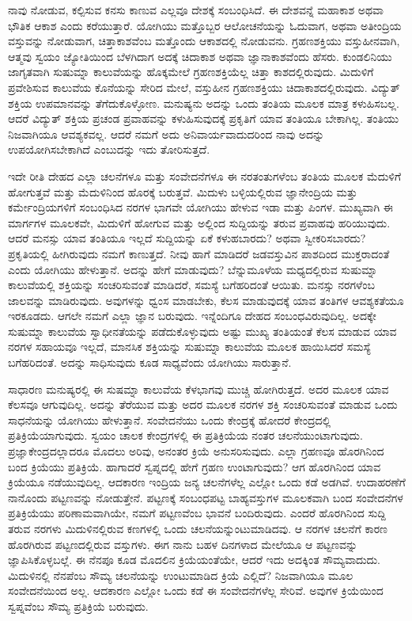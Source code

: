 ನಾವು ನೋಡುವ, ಕಲ್ಪಿಸುವ ಕನಸು ಕಾಣುವ ಎಲ್ಲವೂ ದೇಶಕ್ಕೆ ಸಂಬಂಧಿಸಿದೆ. ಈ ದೇಶವನ್ನೆ ಮಹಾಕಾಶ ಅಥವಾ ಭೌತಿಕ ಆಕಾಶ ಎಂದು ಕರೆಯುತ್ತಾರೆ. ಯೋಗಿಯು ಮತ್ತೊಬ್ಬರ ಆಲೋಚನೆಯನ್ನು ಓದುವಾಗ, ಅಥವಾ ಅತೀಂದ್ರಿಯ ವಸ್ತುವನ್ನು ನೋಡುವಾಗ, ಚಿತ್ತಾಕಾಶವೆಂಬ ಮತ್ತೊಂದು ಆಕಾಶದಲ್ಲಿ ನೋಡುವನು. ಗ್ರಹಣಶಕ್ತಿಯು ವಸ್ತುಹೀನವಾಗಿ, ಆತ್ಮವು ಸ್ವಯಂ ಜ್ಯೋತಿಯಿಂದ ಬೆಳಗಿದಾಗ ಅದಕ್ಕೆ ಚಿದಾಕಾಶ ಅಥವಾ ಜ್ಞಾನಾಕಾಶವೆಂದು ಹೆಸರು. ಕುಂಡಲಿನಿಯು ಜಾಗೃತವಾಗಿ ಸುಷುಮ್ನಾ ಕಾಲುವೆಯನ್ನು ಹೊಕ್ಕಮೇಲೆ ಗ್ರಹಣಶಕ್ತಿಯೆಲ್ಲ ಚಿತ್ತಾ ಕಾಶದಲ್ಲಿರುವುದು. ಮಿದುಳಿಗೆ ಪ್ರವೇಶಿಸುವ ಕಾಲುವೆಯ ಕೊನೆಯನ್ನು ಸೇರಿದ ಮೇಲೆ, ವಸ್ತುಹೀನ ಗ್ರಹಣಶಕ್ತಿಯು  ಚಿದಾಕಾಶದಲ್ಲಿರುವುದು. ವಿದ್ಯುತ್​ಶಕ್ತಿಯ ಉಪಮಾನವನ್ನು ತೆಗೆದುಕೊಳ್ಳೋಣ. ಮನುಷ್ಯನು ಅದನ್ನು ಒಂದು ತಂತಿಯ ಮೂಲಕ ಮಾತ್ರ ಕಳುಹಿಸಬಲ್ಲ. ಆದರೆ ವಿದ್ಯುತ್​ ಶಕ್ತಿಯ ಪ್ರಚಂಡ ಪ್ರವಾಹವನ್ನು ಕಳುಹಿಸುವುದಕ್ಕೆ ಪ್ರಕೃತಿಗೆ ಯಾವ ತಂತಿಯೂ ಬೇಕಾಗಿಲ್ಲ. ತಂತಿಯು ನಿಜವಾಗಿಯೂ ಆವಶ್ಯಕವಲ್ಲ. ಆದರೆ ನಮಗೆ ಅದು ಅನಿವಾರ್ಯವಾದುದರಿಂದ ನಾವು ಅದನ್ನು ಉಪಯೋಗಿಸಬೇಕಾಗಿದೆ ಎಂಬುದನ್ನು ಇದು ತೋರಿಸುತ್ತದೆ. 



ಇದೇ ರೀತಿ ದೇಹದ ಎಲ್ಲಾ ಚಲನೆಗಳೂ ಮತ್ತು ಸಂವೇದನೆಗಳೂ ಈ ನರತಂತುಗಳೆಂಬ ತಂತಿಯ ಮೂಲಕ ಮೆದುಳಿಗೆ ಹೋಗುತ್ತವೆ ಮತ್ತು ಮೆದುಳಿನಿಂದ ಹೊರಕ್ಕೆ ಬರುತ್ತವೆ. ಮಿದುಳು ಬಳ್ಳಿಯಲ್ಲಿರುವ ಜ್ಞಾನೇಂದ್ರಿಯ ಮತ್ತು ಕರ್ಮೇಂದ್ರಿಯಗಳಿಗೆ ಸಂಬಂಧಿಸಿದ ನರಗಳ ಭಾಗವೇ ಯೋಗಿಯು ಹೇಳುವ ಇಡಾ ಮತ್ತು ಪಿಂಗಳ. ಮುಖ್ಯವಾಗಿ ಈ ಮಾರ್ಗಗಳ ಮೂಲಕವೇ, ಮಿದುಳಿಗೆ ಹೋಗುವ ಮತ್ತು ಅಲ್ಲಿಂದ ಸುದ್ದಿಯನ್ನು ತರುವ ಪ್ರವಾಹವು ಹರಿಯುವುದು. ಆದರೆ ಮನಸ್ಸು ಯಾವ ತಂತಿಯೂ ಇಲ್ಲದೆ ಸುದ್ದಿಯನ್ನು ಏಕೆ ಕಳುಹಬಾರದು? ಅಥವಾ ಸ್ವೀಕರಿಸಬಾರದು? ಪ್ರಕೃತಿಯಲ್ಲಿ ಹೀಗಿರುವುದು ನಮಗೆ ಕಾಣುತ್ತದೆ. ನೀವು ಹಾಗೆ ಮಾಡಿದರೆ ಜಡವಸ್ತುವಿನ ಪಾಶದಿಂದ ಮುಕ್ತರಾದಂತೆ ಎಂದು ಯೋಗಿಯು ಹೇಳುತ್ತಾನೆ. ಅದನ್ನು ಹೇಗೆ ಮಾಡುವುದು? ಬೆನ್ನುಮೂಳೆಯ ಮಧ್ಯದಲ್ಲಿರುವ ಸುಷುಮ್ನಾ ಕಾಲುವೆಯಲ್ಲಿ ಶಕ್ತಿಯನ್ನು ಸಂಚರಿಸುವಂತೆ ಮಾಡಿದರೆ, ಸಮಸ್ಯೆ ಬಗೆಹರಿದಂತೆ ಆಯಿತು. ಮನಸ್ಸು ನರಗಳೆಂಬ ಜಾಲವನ್ನು ಮಾಡಿರುವುದು. ಅವುಗಳನ್ನು ಧ್ವಂಸ ಮಾಡಬೇಕು, ಕೆಲಸ ಮಾಡುವುದಕ್ಕೆ ಯಾವ ತಂತಿಗಳ ಆವಶ್ಯಕತೆಯೂ ಇರಕೂಡದು. ಆಗಲೇ ನಮಗೆ ಎಲ್ಲಾ ಜ್ಞಾನ ಬರುವುದು. ಇನ್ನೆಂದಿಗೂ ದೇಹದ ಸಂಬಂಧವಿರುವುದಿಲ್ಲ. ಅದಕ್ಕೇ ಸುಷುಮ್ನಾ ಕಾಲುವೆಯ ಸ್ವಾಧೀನತೆಯನ್ನು ಪಡೆದುಕೊಳ್ಳುವುದು ಅಷ್ಟು ಮುಖ್ಯ ತಂತಿಯಂತೆ ಕೆಲಸ ಮಾಡುವ ಯಾವ ನರಗಳ ಸಹಾಯವೂ ಇಲ್ಲದೆ, ಮಾನಸಿಕ ಶಕ್ತಿಯನ್ನು ಸುಷುಮ್ನಾ ಕಾಲುವೆಯ ಮೂಲಕ ಹಾಯಿಸಿದರೆ ಸಮಸ್ಯೆ ಬಗೆಹರಿದಂತೆ. ಅದನ್ನು ಸಾಧಿಸುವುದು ಕೂಡ ಸಾಧ್ಯವೆಂದು ಯೋಗಿಯು ಸಾರುತ್ತಾನೆ. 


ಸಾಧಾರಣ ಮನುಷ್ಯರಲ್ಲಿ ಈ ಸುಷಮ್ನಾ ಕಾಲುವೆಯ ಕೆಳಭಾಗವು ಮುಚ್ಚಿ ಹೋಗಿರುತ್ತದೆ. ಅದರ ಮೂಲಕ ಯಾವ ಕೆಲಸವೂ ಆಗುವುದಿಲ್ಲ. ಅದನ್ನು ತೆರೆಯುವ ಮತ್ತು ಅದರ ಮೂಲಕ ನರಗಳ ಶಕ್ತಿ ಸಂಚರಿಸುವಂತೆ ಮಾಡುವ ಒಂದು ಸಾಧನೆಯನ್ನು ಯೋಗಿಯು ಹೇಳುತ್ತಾನೆ. ಸಂವೇದನೆಯು ಒಂದು ಕೇಂದ್ರಕ್ಕೆ ಹೋದರೆ ಕೇಂದ್ರದಲ್ಲಿ ಪ್ರತಿಕ್ರಿಯೆಯಾಗುವುದು. ಸ್ವಯಂ ಚಾಲಕ ಕೇಂದ್ರಗಳಲ್ಲಿ  ಈ ಪ್ರತಿಕ್ರಿಯೆಯ ನಂತರ ಚಲನೆಯುಂಟಾಗುವುದು. ಪ್ರಜ್ಞಾಕೇಂದ್ರದಲ್ಲಾದರೂ ಮೊದಲು ಅರಿವು, ಅನಂತರ ಕ್ರಿಯೆ ಅನುಸರಿಸುವುದು. ಎಲ್ಲಾ ಗ್ರಹಣವೂ ಹೊರಗಿನಿಂದ ಬಂದ ಕ್ರಿಯೆಯು ಪ್ರತಿಕ್ರಿಯೆ. ಹಾಗಾದರೆ ಸ್ವಪ್ನದಲ್ಲಿ ಹೇಗೆ ಗ್ರಹಣ ಉಂಟಾಗುವುದು? ಆಗ ಹೊರಗಿನಿಂದ ಯಾವ ಕ್ರಿಯೆಯೂ ನಡೆಯುವುದಿಲ್ಲ. ಆದಕಾರಣ ಇಂದ್ರಿಯ ಜನ್ಯ ಚಲನೆಗಳೆಲ್ಲ ಎಲ್ಲೋ ಒಂದು ಕಡೆ ಅಡಗಿವೆ. ಉದಾಹರಣೆಗೆ ನಾನೊಂದು ಪಟ್ಟಣವನ್ನು ನೋಡುತ್ತೇನೆ. ಪಟ್ಟಣಕ್ಕೆ ಸಂಬಂಧಪಟ್ಟ ಬಾಹ್ಯವಸ್ತುಗಳ ಮೂಲಕವಾಗಿ ಬಂದ ಸಂವೇದನೆಗಳ ಪ್ರತಿಕ್ರಿಯೆಯು ಪರಿಣಾಮವಾಗಿಯೇ, ನಮಗೆ ಪಟ್ಟಣವೆಂಬ ಭಾವನೆ ಬಂದಿರುವುದು. ಎಂದರೆ ಹೊರಗಿನಿಂದ ಸುದ್ದಿ ತರುವ ನರಗಳು ಮಿದುಳಿನಲ್ಲಿರುವ ಕಣಗಳಲ್ಲಿ ಒಂದು ಚಲನೆಯನ್ನುಂಟುಮಾಡಿದವು. ಆ ನರಗಳ ಚಲನೆಗೆ ಕಾರಣ ಹೊರಗಿರುವ ಪಟ್ಟಣದಲ್ಲಿರುವ ವಸ್ತುಗಳು. ಈಗ ನಾನು ಬಹಳ ದಿನಗಳಾದ ಮೇಲೆಯೂ ಆ ಪಟ್ಟಣವನ್ನು ಜ್ಞಾಪಿಸಿಕೊಳ್ಳಬಲ್ಲೆ. ಈ ನೆನಪೂ ಕೂಡ ಮೊದಲಿನ ಕ್ರಿಯೆಯಂತೆಯೇ, ಆದರೆ ಇದು ಅದಕ್ಕಿಂತ ಸೌಮ್ಯವಾದುದು. ಮಿದುಳಿನಲ್ಲಿ ನೆನಪೆಂಬ ಸೌಮ್ಯ ಚಲನೆಯನ್ನು ಉಂಟುಮಾಡಿದ ಕ್ರಿಯೆ ಎಲ್ಲಿದೆ? ನಿಜವಾಗಿಯೂ ಮೂಲ ಸಂವೇದನೆಯಿಂದ  ಅಲ್ಲ. ಆದಕಾರಣ ಎಲ್ಲೋ ಒಂದು ಕಡೆ ಈ ಸಂವೇದನೆಗಳೆಲ್ಲ ಸೇರಿವೆ. ಅವುಗಳ ಕ್ರಿಯೆಯಿಂದ ಸ್ವಪ್ನವೆಂಬ ಸೌಮ್ಯ ಪ್ರತಿಕ್ರಿಯೆ ಬರುವುದು. 

